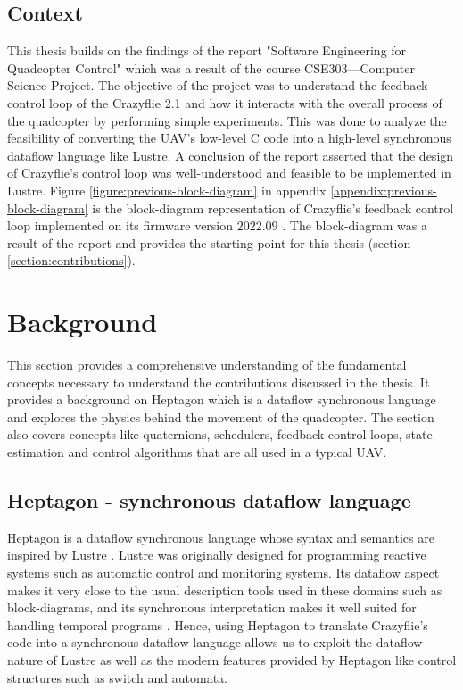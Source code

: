 \documentclass[10pt, a4paper]{article}
\begin{document}
    \subsection{Context}
    This thesis builds on the findings of the report "Software Engineering for Quadcopter Control" \cite{report:cse303-report} which was a result of the course CSE303---Computer Science Project.  The objective of the project was to understand the feedback control loop of the Crazyflie 2.1 and how it interacts with the overall process of the quadcopter by performing simple experiments. This was done to analyze the feasibility of converting the UAV's low-level C code into a high-level synchronous dataflow language like Lustre. A conclusion of the report asserted that the design of Crazyflie's control loop was well-understood and feasible to be implemented in Lustre. Figure \ref{figure:previous-block-diagram} in appendix \ref{appendix:previous-block-diagram} is the block-diagram representation of Crazyflie's feedback control loop implemented on its firmware version $2022.09$ \cite{software:Crazyflie-github-previous-version}. The block-diagram was a result of the report and provides the starting point for this thesis (section \ref{section:contributions}).

\section{Background}
    This section provides a comprehensive understanding of the fundamental concepts necessary to understand the contributions discussed in the thesis. It provides a background on Heptagon which is a dataflow synchronous language and explores the physics behind the movement of the quadcopter. The section also covers concepts like quaternions, schedulers, feedback control loops, state estimation and control algorithms that are all used in a typical UAV.

    \subsection{Heptagon - synchronous dataflow language}
    \label{section:Heptagon}
    Heptagon is a dataflow synchronous language whose syntax and semantics are inspired by Lustre \cite{software:heptagon-compiler}. Lustre was originally designed for programming reactive systems such as  automatic control and monitoring systems. Its dataflow aspect makes it very close to the usual description tools used in these domains such as block-diagrams, and its synchronous interpretation makes it well suited for handling temporal programs \cite{article:lustre-paper}. Hence, using Heptagon to translate Crazyflie's code into a synchronous dataflow language allows us to exploit the dataflow nature of Lustre as well as the modern features provided by Heptagon like control structures such as switch and automata.
\end{document}
